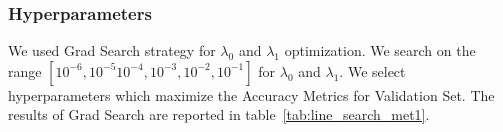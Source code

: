 \subsubsection{\label{seq:hyperparam}Hyperparameters}
We used Grad Search strategy for $\lambda_0$ and $\lambda_1$ optimization.
We search on the range 
$[10^{-6},10^{-5}10^{-4},10^{-3},10^{-2},10^{-1}]$ for $\lambda_0$ and $\lambda_1$.   
We select hyperparameters which maximize the Accuracy Metrics for Validation Set.
The results of Grad Search are reported in table~\ref{tab:line_search_met1}.
\begin{table}
\caption{\label{tab:line_search_met1}Best results of Grad Search for the optimization of
hyperparameters for each dataset for the Unclustered Keywords method.}
\centering
{}
\end{table}

